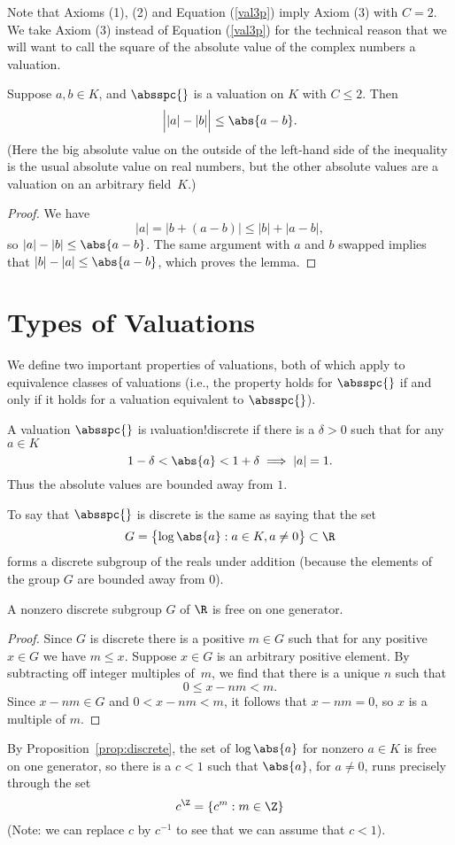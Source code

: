 Note that Axioms (1), (2) and Equation (\ref{val3p}) imply Axiom (3)
with $C=2$.  We take Axiom (3) instead of Equation (\ref{val3p}) for
the technical reason that we will want to call the square of the
absolute value of the complex numbers a valuation.

\begin{lemma}
Suppose $a, b \in K$, and $\absspc{}$ is a valuation on $K$
with $C\leq 2$.
Then 
$$
  \Bigl||a| - |b|\Bigr| \leq \abs{a-b}.
$$
(Here the big absolute value on the outside of the left-hand
side of the inequality is the usual absolute value on 
real numbers, but the other absolute values are a valuation
on an arbitrary field~$K$.)
\end{lemma}
\begin{proof}
We have 
$$|a| = |b + (a-b)| \leq |b| + |a-b|,$$
so $|a|-|b|\leq \abs{a-b}$.  The same argument
with $a$ and $b$ swapped implies that
$|b|-|a|\leq \abs{a-b}$, which proves the lemma.
\end{proof}


\section{Types of Valuations}
We define two important properties of valuations, both of which
apply to  equivalence classes of valuations (i.e., the property
holds for $\absspc{}$ if and only if it holds for a valuation
equivalent to $\absspc{}$).
\begin{definition}[Discrete]
A valuation $\absspc{}$ is \i{valuation!discrete} 
if there is a $\delta>0$
such that for any $a\in K$ 
$$
   1-\delta < \abs{a} < 1+\delta \implies |a|=1.
$$
Thus the absolute values are bounded away from $1$.
\end{definition}
To say that $\absspc{}$ is discrete is the same as saying
that the set
$$G=\bigl\{
  \log\abs{a} : a \in K, a\neq 0
\bigr\} \subset \R
$$
forms a discrete subgroup of the reals under addition (because
the elements of the group $G$ are bounded away from $0$).
\begin{proposition}\label{prop:discrete}
A nonzero discrete subgroup $G$ of $\R$ is free on one generator.
\end{proposition}
\begin{proof}
Since $G$ is discrete there is a positive  $m\in G$
such that for any positive $x\in G$ we have $m\leq x$.
Suppose $x\in G$ is an arbitrary positive element.
By subtracting off integer multiples of~$m$, we
find that there is a unique $n$ such that
$$
   0\leq x-nm <m.
$$
Since $x-nm\in G$ and $0<x-nm<m$, it follows
that $x-nm=0$, so $x$ is a multiple of $m$.
\end{proof}
By Proposition~\ref{prop:discrete}, the set 
of $\log\abs{a}$ for nonzero $a\in K$
is free on one generator, so there
is a $c<1$ such that $\abs{a}$, for $a\neq 0$,
runs precisely through the set $$c^\Z = \{c^m : m\in \Z\}$$
(Note: we can replace $c$ by $c^{-1}$ to see that we
can assume that $c<1$).

